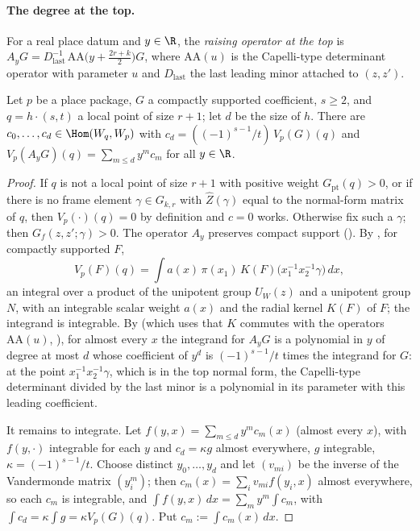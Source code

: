 \paragraph{The degree at the top.}
For a real place datum and $y\in\R$, the \emph{raising operator at the top} is $A_yG=D_{\mathrm{last}}^{-1}\,
\mathrm{AA}\bigl(y+\tfrac{2r+k}{2}\bigr)G$, where $\mathrm{AA}(u)$ is the Capelli-type determinant operator with parameter
$u$ and $D_{\mathrm{last}}$ the last leading minor attached to $(z,z')$.

\begin{lemma}\label{pf:thmS-carrier:polytop}
Let $p$ be a place package, $G$ a compactly supported coefficient, $s\ge2$, and $q=h\cdot(s,t)$ a local point of size $r+1$;
let $d$ be the size of $h$. There are $c_0,\dots,c_d\in\Hom(W_q,W_p)$ with $c_d=((-1)^{s-1}/t)\,V_p(G)(q)$ and
$V_p(A_yG)(q)=\sum_{m\le d}y^mc_m$ for all $y\in\R$.
\end{lemma}

\begin{proof}
If $q$ is not a local point of size $r+1$ with positive weight $G_{\mathrm{pt}}(q)>0$, or if there is no frame element
$\gamma\in G_{k,r}$ with $\hat Z(\gamma)$ equal to the normal-form matrix of $q$, then $V_p(\cdot)(q)=0$ by definition and
$c=0$ works. Otherwise fix such a $\gamma$; then $G_f(z,z';\gamma)>0$. The operator $A_y$ preserves compact support
(). By
, for compactly supported $F$,
\[
V_p(F)(q)=\int a(x)\,\pi(x_1)\,K(F)\bigl(x_1^{-1}x_2^{-1}\gamma\bigr)\,dx,
\]
an integral over a product of the unipotent group $U_W(z)$ and a unipotent group $N$, with an integrable scalar weight $a(x)$
and the radial kernel $K(F)$ of $F$; the integrand is integrable. By
 (which uses that $K$ commutes with the operators
$\mathrm{AA}(u)$, ), for almost
every $x$ the integrand for $A_yG$ is a polynomial in $y$ of degree at most $d$ whose coefficient of $y^d$ is $(-1)^{s-1}/t$
times the integrand for $G$: at the point $x_1^{-1}x_2^{-1}\gamma$, which is in the top normal form, the Capelli-type
determinant divided by the last minor is a polynomial in its parameter with this leading coefficient.

It remains to integrate. Let $f(y,x)=\sum_{m\le d}y^mc_m(x)$ (almost every $x$), with $f(y,\cdot)$ integrable for each $y$ and
$c_d=\kappa g$ almost everywhere, $g$ integrable, $\kappa=(-1)^{s-1}/t$. Choose distinct $y_0,\dots,y_d$ and let $(v_{mi})$ be
the inverse of the Vandermonde matrix $(y_i^m)$; then $c_m(x)=\sum_iv_{mi}f(y_i,x)$ almost everywhere, so each $c_m$ is
integrable, and $\int f(y,x)\,dx=\sum_my^m\int c_m$, with $\int c_d=\kappa\int g=\kappa V_p(G)(q)$. Put $c_m:=\int c_m(x)\,dx$.
\end{proof}

